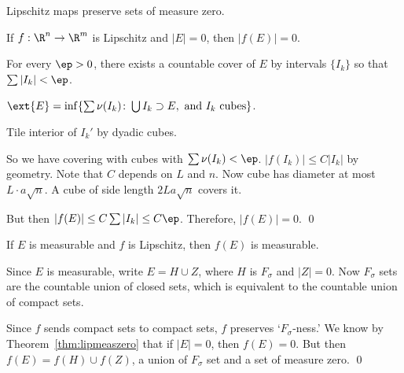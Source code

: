 Lipschitz maps preserve sets of measure zero.

\begin{thm} \label{thm:lipmeaszero}
If $f: \R^n \to \R^m$ is Lipschitz and $|E|=0$, then $|f(E)|=0$. 
\end{thm}

\pf For every $\ep>0$, there exists a countable cover of $E$ by intervals $\{I_k\}$ so that $\sum |I_k| < \ep$. 



$\ext{E}= \inf \{ \sum \nu(I_k) \colon \bigcup I_k \supset E, \text{ and }I_k \text{ cubes}\}$.

Tile interior of $I_k'$ by dyadic cubes. 

So we have covering with cubes with $\sum \nu(I_k)<\ep$. $|f(I_k)| \leq C |I_k|$ by geometry. Note that $C$ depends on $L$ and $n$. Now cube has diameter at most $L \cdot a \sqrt{n}$. A cube of side length $2L a \sqrt{n}$ covers it. 


But then $|f(E)| \leq C \sum |I_k| \leq C\ep$. Therefore, $|f(E)|=0$. \qed \\


\begin{thm}
If $E$ is measurable and $f$ is Lipschitz, then $f(E)$ is measurable.
\end{thm}

\pf Since $E$ is measurable, write $E= H \cup Z$, where $H$ is $F_\sigma$ and $|Z|=0$. Now $F_\sigma$ sets are the countable union of closed sets, which is equivalent to the countable union of compact sets. 



Since $f$ sends compact sets to compact sets, $f$ preserves `$F_\sigma$-ness.' We know by Theorem~\ref{thm:lipmeaszero} that if $|E|=0$, then $f(E)=0$. But then $f(E)= f(H) \cup f(Z)$, a union of $F_\sigma$ set and a set of measure zero. \qed \\




